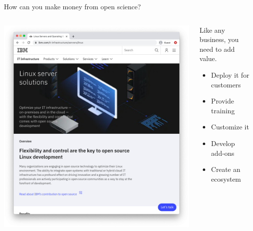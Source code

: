\begin{frame}{How can you make money from open science?}

\begin{columns}[c]

    \begin{column}{0.45\textwidth}
        \includegraphics[width=\textwidth]{images/IBM_linux.png}\pause
    \end{column}
    
    \begin{column}{0.45\textwidth}
        Like any business, you need to add value.
        \begin{itemize}
            \item Deploy it for customers
            \item Provide training
            \item Customize it
            \item Develop add-ons
            \item Create an ecosystem
        \end{itemize}
    \end{column}
    
\end{columns}

\end{frame}

